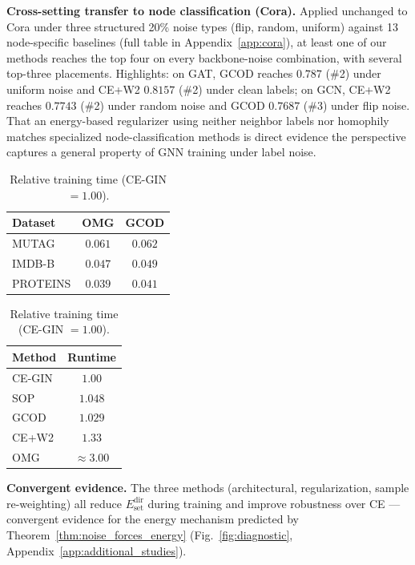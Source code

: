\documentclass{article}
\theoremstyle{definition}
\newcommand{\method}{GCOD}
\newcommand{\Edirset}{E^{\text{dir}}_{\text{set}}}
\begin{document}
\textbf{Cross-setting transfer to node classification (Cora).} Applied unchanged to Cora under three structured 20\% noise types (flip, random, uniform) against 13 node-specific baselines (full table in Appendix~\ref{app:cora}), at least one of our methods reaches the top four on every backbone-noise combination, with several top-three placements. Highlights: on GAT, \method{} reaches $0.787$ (\#2) under uniform noise and CE+W2 $0.8157$ (\#2) under clean labels; on GCN, CE+W2 reaches $0.7743$ (\#2) under random noise and \method{} $0.7687$ (\#3) under flip noise. That an energy-based regularizer using neither neighbor labels nor homophily matches specialized node-classification methods is direct evidence the perspective captures a general property of GNN training under label noise.

\begin{table}[t]
\centering
\begin{minipage}{0.55\linewidth}
\caption{OMG protocol (Yin et al., 2023). Percentage gain over CE.}
\label{tab:omg_table}
\centering
\renewcommand{\arraystretch}{1.05}
\begin{tabular}{lcc}
\toprule
\textbf{Dataset} & \textbf{OMG} & \textbf{\method{}}\\
\midrule
MUTAG    & $0.061$ & $0.062$\\
IMDB-B   & $0.047$ & $0.049$\\
PROTEINS & $0.039$ & $0.041$\\
\bottomrule
\end{tabular}
\end{minipage}
\hfill
\begin{minipage}{0.40\linewidth}
\caption{Relative training time (CE-GIN $=1.00$).}
\label{tab:runtime}
\centering
\renewcommand{\arraystretch}{1.05}
\begin{tabular}{lc}
\toprule
\textbf{Method} & \textbf{Runtime}\\
\midrule
CE-GIN & $1.00$\\
SOP    & $1.048$\\
\method{} & $\mathbf{1.029}$\\
CE+W2  & $1.33$\\
OMG~\citep{omg7} & $\approx 3.00$\\
\bottomrule
\end{tabular}
\end{minipage}
\end{table}

\textbf{Convergent evidence.} The three methods (architectural, regularization, sample re-weighting) all reduce $\Edirset$ during training and improve robustness over CE — convergent evidence for the energy mechanism predicted by Theorem~\ref{thm:noise_forces_energy} (Fig.~\ref{fig:diagnostic}, Appendix~\ref{app:additional_studies}).
\end{document}
